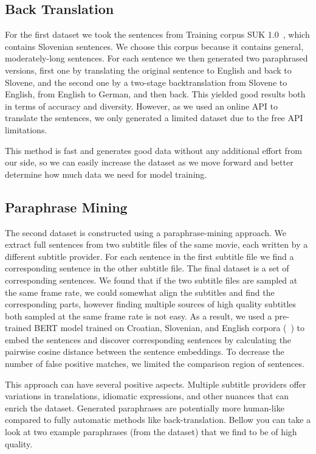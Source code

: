 \documentclass[fleqn,moreauthors,10pt]{ds_report}
\begin{document}
\subsection{Back Translation}

For the first dataset we took the sentences from {Training corpus SUK 1.0}~\cite{11356/1747}, which contains  Slovenian sentences. We choose this corpus because it contains general, moderately-long sentences. For each sentence we then generated two paraphrased versions, first one by translating the original sentence to English and back to Slovene, and the second one by a two-stage backtranslation from Slovene to English, from English to German, and then back. This yielded good results both in terms of accuracy and diversity. However, as we used an online API to translate the sentences, we only generated a limited dataset due to the free API limitations.

This method is fast and generates good data without any additional effort from our side, so we can easily increase the dataset as we move forward and better determine how much data we need for model training.


\subsection{Paraphrase Mining}

The second dataset is constructed using a paraphrase-mining approach. We extract full sentences from two subtitle files of the same movie, each written by a different subtitle provider. For each sentence in the first subtitle file we find a corresponding sentence in the other subtitle file. The final dataset is a set of corresponding sentences. We found that if the two subtitle files are sampled at the same frame rate, we could somewhat align the subtitles and find the corresponding parts, however finding multiple sources of high quality subtitles both sampled at the same frame rate is not easy. As a result, we used a pre-trained BERT model trained on Croatian, Slovenian, and English corpora (~\cite{11356/1694}) to embed the sentences and discover corresponding sentences by calculating the pairwise cosine distance between the sentence embeddings. To decrease the number of false positive matches, we limited the comparison region of sentences. 

This approach can have several positive aspects. Multiple subtitle providers offer variations in translations, idiomatic expressions, and other nuances that can enrich the dataset. Generated paraphrases are potentially more human-like compared to fully automatic methods like back-translation. Bellow you can take a look at two example paraphrases (from the dataset) that we find to be of high quality.
\end{document}
